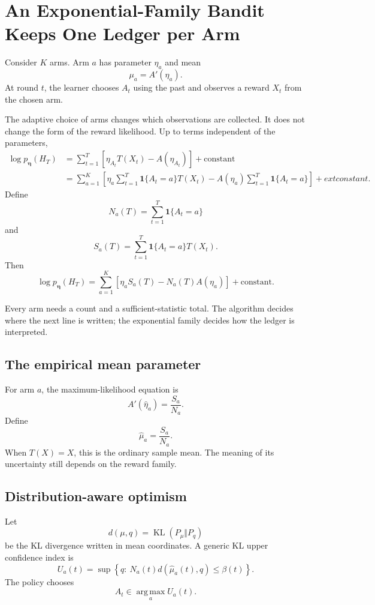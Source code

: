 \documentclass[en,nofont,11pt]{elegantbook}
\newcommand{\KL}{\operatorname{KL}}
\newcommand{\argmax}{\operatorname*{arg\,max}}
\newcommand{\ind}{\mathbf{1}}
\begin{document}
\chapter{An Exponential-Family Bandit Keeps One Ledger per Arm}

Consider $K$ arms. Arm $a$ has parameter $\eta_a$ and mean
\[
\mu_a=A'(\eta_a).
\]
At round $t$, the learner chooses $A_t$ using the past and observes a reward $X_t$ from the chosen arm.

The adaptive choice of arms changes which observations are collected. It does not change the form of the reward likelihood. Up to terms independent of the parameters,
\begin{align*}
\log p_{\bm\eta}(H_T)
&=\sum_{t=1}^{T}
\left[\eta_{A_t}T(X_t)-A(\eta_{A_t})\right]+\text{constant}\\
&=\sum_{a=1}^{K}
\left[
\eta_a\sum_{t=1}^{T}\ind\{A_t=a\}T(X_t)
-
A(\eta_a)\sum_{t=1}^{T}\ind\{A_t=a\}
\right]+	ext{constant}.
\end{align*}
Define
\[
N_a(T)=\sum_{t=1}^{T}\ind\{A_t=a\}
\]
and
\[
S_a(T)=\sum_{t=1}^{T}\ind\{A_t=a\}T(X_t).
\]
Then
\begin{equation}
\boxed{
\log p_{\bm\eta}(H_T)
=
\sum_{a=1}^{K}\left[\eta_aS_a(T)-N_a(T)A(\eta_a)\right]
+\text{constant}.
}
\label{eq:bandit-ledger}
\end{equation}

Every arm needs a count and a sufficient-statistic total. The algorithm decides where the next line is written; the exponential family decides how the ledger is interpreted.

\section{The empirical mean parameter}

For arm $a$, the maximum-likelihood equation is
\[
A'(\widehat\eta_a)=\frac{S_a}{N_a}.
\]
Define
\[
\widehat\mu_a=\frac{S_a}{N_a}.
\]
When $T(X)=X$, this is the ordinary sample mean. The meaning of its uncertainty still depends on the reward family.

\section{Distribution-aware optimism}

Let
\[
d(\mu,q)=\KL(P_\mu\Vert P_q)
\]
be the KL divergence written in mean coordinates. A generic KL upper confidence index is
\begin{equation}
U_a(t)
=
\sup\left\{
q:\ N_a(t)d(\widehat\mu_a(t),q)\le\beta(t)
\right\}.
\label{eq:generic-kl-ucb}
\end{equation}
The policy chooses
\[
A_t\in\argmax_a U_a(t).
\]
\end{document}
